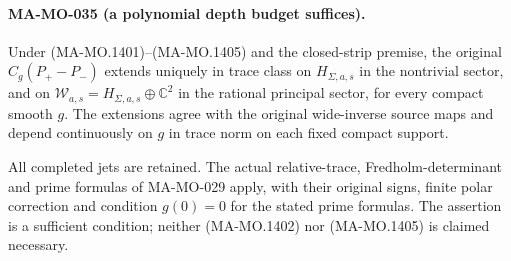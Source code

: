 \paragraph{MA-MO-035 (a polynomial depth budget suffices).}
Under (MA-MO.1401)--(MA-MO.1405) and the closed-strip premise,
the original $C_g(P_+-P_-)$ extends uniquely in trace class
on $H_{\Sigma,a,s}$ in the nontrivial sector, and on
$\mathcal W_{a,s}=H_{\Sigma,a,s}\oplus\mathbb C^2$ in the
rational principal sector, for every compact smooth $g$.
The extensions agree with the original wide-inverse source maps
and depend continuously on $g$ in trace norm on each fixed
compact support.

All completed jets are retained.  The actual relative-trace,
Fredholm-determinant and prime formulas of MA-MO-029 apply,
with their original signs, finite polar correction and condition
$g(0)=0$ for the stated prime formulas.  The assertion is a
sufficient condition; neither (MA-MO.1402) nor (MA-MO.1405)
is claimed necessary.

